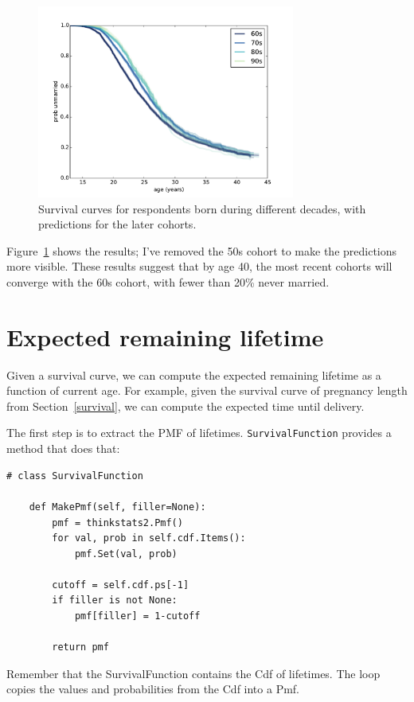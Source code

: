 \documentclass[12pt]{book}
\begin{document}
\begin{figure}
\centerline{\includegraphics[height=2.5in]{figs/survival5.pdf}}
\caption{Survival curves for respondents born during different decades,
with predictions for the later cohorts.}
\label{survival5}
\end{figure}

Figure~\ref{survival5} shows the results; I've removed the 50s cohort
to make the predictions more visible.  These results suggest that by
age 40, the most recent cohorts will converge with the 60s cohort,
with fewer than 20\% never married.


\section{Expected remaining lifetime}

Given a survival curve, we can compute the expected remaining
lifetime as a function of current age.  For example, given the
survival curve of pregnancy length from Section~\ref{survival},
we can compute the expected time until delivery.

The first step is to extract the PMF of lifetimes.  {\tt SurvivalFunction}
provides a method that does that:

\begin{verbatim}
# class SurvivalFunction

    def MakePmf(self, filler=None):
        pmf = thinkstats2.Pmf()
        for val, prob in self.cdf.Items():
            pmf.Set(val, prob)

        cutoff = self.cdf.ps[-1]
        if filler is not None:
            pmf[filler] = 1-cutoff

        return pmf
\end{verbatim}

Remember that the SurvivalFunction contains the Cdf of lifetimes.
The loop copies the values and probabilities from the Cdf into
a Pmf.
\end{document}
